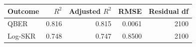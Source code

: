 \begin{tabular}{lrrrr}
\toprule
Outcome & $R^2$ & Adjusted $R^2$ & RMSE & Residual df \\
\midrule
QBER & 0.816 & 0.815 & 0.0061 & 2100 \\
Log-SKR & 0.748 & 0.747 & 0.8500 & 2100 \\
\bottomrule
\end{tabular}
